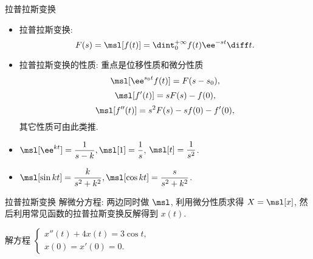 \documentclass[aspectratio=169,handout]{ctexbeamer}
\begin{document}
\begin{frame}{拉普拉斯变换}
	\begin{itemize}
		\item 拉普拉斯变换:
	\[
			F(s)=\msl[f(t)]=\dint_0^{+\infty}f(t)\ee^{-st}\diff t.
	\]
		\item 拉普拉斯变换的性质: 重点是位移性质和微分性质
	\[
		\msl[\ee^{s_0t}f(t)]=F(s-s_0),
	\]
	\[
		\msl[f'(t)]=sF(s)-f(0),
	\]
	\[
		\msl[f''(t)]=s^2F(s)-sf(0)-f'(0),
	\]
		其它性质可由此类推.
		\item $\msl[\ee^{kt}]=\dfrac1{s-k},\msl[1]=\dfrac1s$,
		$\msl[t]=\dfrac1{s^2}$.
		\item $\msl[\sin{kt}]=\dfrac k{s^2+k^2},\msl[\cos{kt}]=\dfrac s{s^2+k^2}$.
	\end{itemize}
\end{frame}


\begin{frame}{拉普拉斯变换}
	\onslide<+->
	解微分方程: 两边同时做 $\msl$, 利用微分性质求得 $X=\msl[x]$, 然后利用常见函数的拉普拉斯变换反解得到 $x(t)$.
	\onslide<+->
	\begin{exercise}
		解方程 
		$\begin{cases}
			x''(t)+4x(t)=3\cos t,& \\
			x(0)=x'(0)=0.&
		\end{cases}$
	\end{exercise}
\end{frame}
\end{document}

